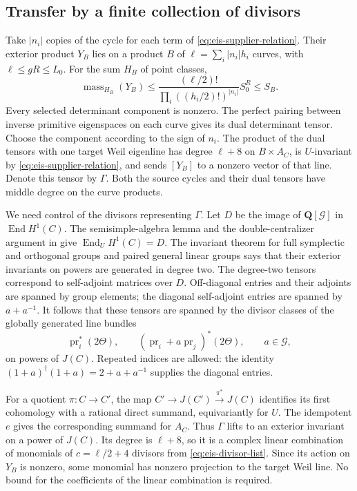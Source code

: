 \documentclass[11pt]{article}
\theoremstyle{definition}
\theoremstyle{remark}
\newcommand{\Q}{\mathbf Q}
\begin{document}
\subsection{Transfer by a finite collection of divisors}

Take $|n_i|$ copies of the cycle for each term of
\eqref{eq:eis-supplier-relation}. Their exterior product $Y_B$ lies on
a product $B$ of $\ell=\sum_i|n_i|h_i$ curves, with
$\ell\le gR\le L_0$. For the sum $H_B$ of point classes,
\begin{equation}\label{eq:eis-product-mass}
 \operatorname{mass}_{H_B}(Y_B)
 \le \frac{(\ell/2)!}{\prod_i((h_i/2)!)^{|n_i|}}S_0^R
 \le S_B.
\end{equation}
Every selected determinant component is nonzero. The perfect pairing
between inverse primitive eigenspaces on each curve gives its dual
determinant tensor. Choose the component according to the sign of
$n_i$. The product of the dual tensors with one target Weil eigenline
has degree $\ell+8$ on $B\times A_C$, is $U$-invariant by
\eqref{eq:eis-supplier-relation}, and sends $[Y_B]$ to a nonzero vector
of that line. Denote this tensor by $\Gamma$. Both the source cycles
and their dual tensors have middle degree on the curve products.

We need control of the divisors representing $\Gamma$. Let
$D$ be the image of $\Q[\mathcal G]$ in $\operatorname{End}H^1(C)$.
The semisimple-algebra lemma and the double-centralizer argument in
\cite[Lemma~3.5]{MilneLefschetz} give
$\operatorname{End}_U H^1(C)=D$. The invariant theorem for full
symplectic and orthogonal groups and paired general linear groups
\cite[Proposition~3.6 and Remark~3.7]{MilneLefschetz} says that their
exterior invariants on powers are generated in degree two.
The degree-two tensors correspond to self-adjoint matrices over $D$.
Off-diagonal entries and their adjoints are spanned by group elements;
the diagonal self-adjoint entries are spanned by $a+a^{-1}$.
It follows that these tensors are spanned by the divisor classes of
the globally generated line bundles
\begin{equation}\label{eq:eis-divisor-list}
 \operatorname{pr}_i^*(2\Theta),\qquad
 (\operatorname{pr}_i+a\operatorname{pr}_j)^*(2\Theta),
 \qquad a\in\mathcal G,
\end{equation}
on powers of $J(C)$. Repeated indices are allowed: the identity
$(1+a)^\dagger(1+a)=2+a+a^{-1}$ supplies the diagonal entries.

For a quotient $\pi:C\to C'$, the map
$C'\to J(C')\xrightarrow{\pi^*}J(C)$ identifies its first cohomology
with a rational direct summand, equivariantly for $U$. The idempotent
$e$ gives the corresponding summand for $A_C$. Thus $\Gamma$ lifts
to an exterior invariant on a power of $J(C)$. Its degree is $\ell+8$,
so it is a complex linear combination of monomials of
$c=\ell/2+4$ divisors from \eqref{eq:eis-divisor-list}. Since its
action on $Y_B$ is nonzero, some monomial has nonzero projection to
the target Weil line. No bound for the coefficients of the linear
combination is required.
\end{document}
